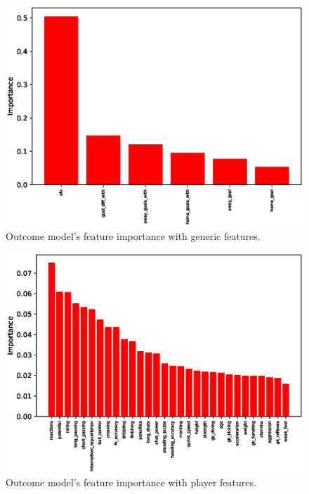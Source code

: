 \begin{figure}[H]
    \centering
    \includegraphics[width=1\textwidth]{img/match_level_2018_outcome_feature_importance_gf_feature_importance.eps}
    \caption{Outcome model's feature importance with generic features.}
    \label{fig:outcome_feature_importance_gf}
\end{figure}

\begin{figure}[H]
    \centering
    \includegraphics[width=1\textwidth]{img/match_level_2018_outcome_feature_importance_pf_feature_importance.eps}
    \caption{Outcome model's feature importance with player features.}
    \label{fig:outcome_feature_importance_pf}
\end{figure}

